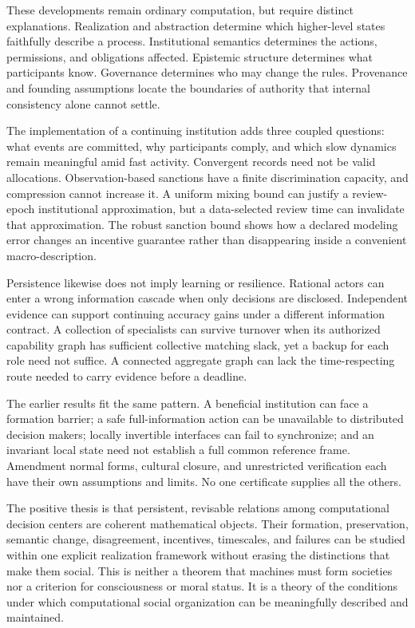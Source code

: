 \documentclass[11pt,letterpaper]{article}
\theoremstyle{plain}
\theoremstyle{definition}
\theoremstyle{remark}
\begin{document}
These developments remain ordinary computation, but require distinct explanations. Realization and abstraction determine which higher-level states faithfully describe a process. Institutional semantics determines the actions, permissions, and obligations affected. Epistemic structure determines what participants know. Governance determines who may change the rules. Provenance and founding assumptions locate the boundaries of authority that internal consistency alone cannot settle.

The implementation of a continuing institution adds three coupled questions: what events are committed, why participants comply, and which slow dynamics remain meaningful amid fast activity. Convergent records need not be valid allocations. Observation-based sanctions have a finite discrimination capacity, and compression cannot increase it. A uniform mixing bound can justify a review-epoch institutional approximation, but a data-selected review time can invalidate that approximation. The robust sanction bound shows how a declared modeling error changes an incentive guarantee rather than disappearing inside a convenient macro-description.

Persistence likewise does not imply learning or resilience. Rational actors can enter a wrong information cascade when only decisions are disclosed. Independent evidence can support continuing accuracy gains under a different information contract. A collection of specialists can survive turnover when its authorized capability graph has sufficient collective matching slack, yet a backup for each role need not suffice. A connected aggregate graph can lack the time-respecting route needed to carry evidence before a deadline.

The earlier results fit the same pattern. A beneficial institution can face a formation barrier; a safe full-information action can be unavailable to distributed decision makers; locally invertible interfaces can fail to synchronize; and an invariant local state need not establish a full common reference frame. Amendment normal forms, cultural closure, and unrestricted verification each have their own assumptions and limits. No one certificate supplies all the others.

The positive thesis is that persistent, revisable relations among computational decision centers are coherent mathematical objects. Their formation, preservation, semantic change, disagreement, incentives, timescales, and failures can be studied within one explicit realization framework without erasing the distinctions that make them social. This is neither a theorem that machines must form societies nor a criterion for consciousness or moral status. It is a theory of the conditions under which computational social organization can be meaningfully described and maintained.
\FloatBarrier
\end{document}

